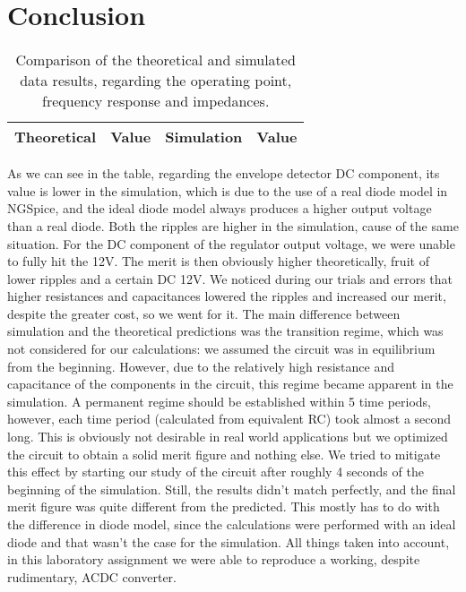\section{Conclusion}
\label{sec:conclusion}
\begin{table}[!h]
  \centering
  \begin{tabular}{c c c c}
    \hline    
    {\bf Theoretical} & {\bf Value} & {\bf Simulation} & {\bf Value}\\ \hline
     
  \end{tabular}
  \caption{Comparison of the theoretical and simulated data results, regarding the operating point, frequency response and impedances.}
  \label{tab:comp}
\end{table}

As we can see in the table, regarding the envelope detector DC component, its value is lower in the simulation, which is due to the use of a real diode model in NGSpice, and the ideal diode model always produces a higher output voltage than a real diode. Both the ripples are higher in the simulation, cause of the same situation. For the DC component of the regulator output voltage, we were unable to fully hit the 12V. The merit is then obviously higher theoretically, fruit of lower ripples and a certain DC 12V. We noticed during our trials and errors that higher resistances and capacitances lowered the ripples and increased our merit, despite the greater cost, so we went for it.
The main difference between simulation and the theoretical predictions was the transition regime, which was not considered for our calculations: we assumed the circuit was in equilibrium from the beginning. However, due to the relatively high resistance and capacitance of the components in the circuit, this regime became apparent in the simulation. A permanent regime should be established within 5 time periods, however, each time period (calculated from equivalent RC) took almost a second long. This is obviously not desirable in real world applications but we optimized the circuit to obtain a solid merit figure and nothing else.
We tried to mitigate this effect by starting our study of the circuit after roughly 4 seconds of the beginning of the simulation. Still, the results didn't match perfectly, and the final merit figure was quite different from the predicted. This mostly has to do with the difference in diode model, since the calculations were performed with an ideal diode and that wasn't the case for the simulation.
All things taken into account, in this laboratory assignment we were able to reproduce a working, despite rudimentary, ACDC converter. 

